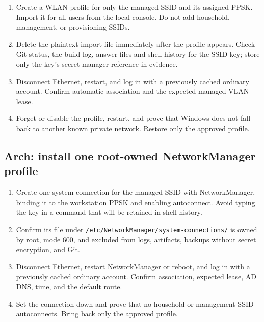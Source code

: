 \begin{enumerate}
\item Create a WLAN profile for only the managed SSID and its assigned PPSK.
Import it for all users from the local console. Do not add household,
management, or provisioning SSIDs.
\item Delete the plaintext import file immediately after the profile appears.
Check Git status, the build log, answer files and shell history for the SSID
key; store only the key's secret-manager reference in evidence.
\item Disconnect Ethernet, restart, and log in with a previously cached
ordinary account. Confirm automatic association and the expected managed-VLAN
lease.
\item Forget or disable the profile, restart, and prove that Windows does not
fall back to another known private network. Restore only the approved profile.
\end{enumerate}


\subsection*{Arch: install one root-owned NetworkManager profile}

\begin{enumerate}
\item Create one system connection for the managed SSID with NetworkManager,
binding it to the workstation PPSK and enabling autoconnect. Avoid typing the
key in a command that will be retained in shell history.
\item Confirm its file under
\texttt{/etc/NetworkManager/system-connections/} is owned by root, mode 600,
and excluded from logs, artifacts, backups without secret encryption, and Git.
\item Disconnect Ethernet, restart NetworkManager or reboot, and log in with a
previously cached ordinary account. Confirm association, expected lease, AD
DNS, time, and the default route.
\item Set the connection down and prove that no household or management SSID
autoconnects. Bring back only the approved profile.
\end{enumerate}

